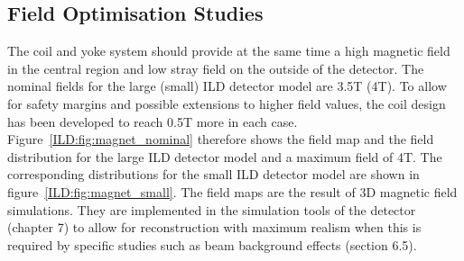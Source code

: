 \subsection{Field Optimisation Studies}

The coil and yoke system should provide at the same time a high magnetic field in the central region and low stray field on the outside of the detector. The nominal fields for the large (small) ILD detector model are 3.5T (4T). To allow for safety margins and possible extensions to higher field values, the coil design has been developed to reach 0.5T more in each case. Figure~\ref{ILD:fig:magnet_nominal} therefore shows the field map and the field distribution for the large ILD detector model and a maximum field of 4T. The corresponding distributions for the small ILD detector model are shown in figure~\ref{ILD:fig:magnet_small}. The field maps are the result of 3D magnetic field simulations. They are implemented in the simulation tools of the detector (chapter 7) to allow for reconstruction with maximum realism when this is required by specific studies such as beam background effects (section 6.5). 

